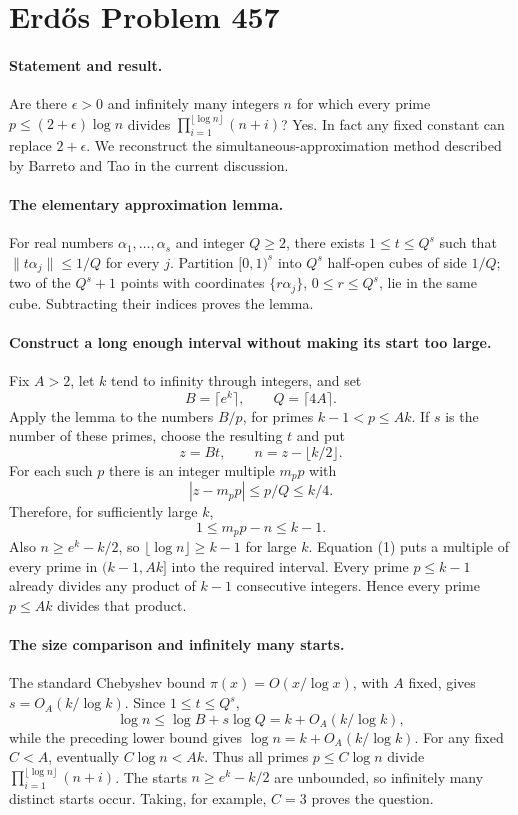 \section*{Erd\H{o}s Problem 457}

\paragraph{Statement and result.}
Are there \(\epsilon>0\) and infinitely many integers \(n\) for which
every prime \(p\leq(2+\epsilon)\log n\) divides
\(\prod_{i=1}^{\lfloor\log n\rfloor}(n+i)\)?
Yes. In fact any fixed constant can replace \(2+\epsilon\).
We reconstruct the simultaneous-approximation method described by
Barreto and Tao in the current discussion.

\paragraph{The elementary approximation lemma.}
For real numbers \(\alpha_1,\ldots,\alpha_s\) and integer \(Q\geq2\),
there exists \(1\leq t\leq Q^s\) such that
\(\|t\alpha_j\|\leq1/Q\) for every \(j\).
Partition \([0,1)^s\) into \(Q^s\) half-open cubes of side \(1/Q\);
two of the \(Q^s+1\) points with coordinates
\(\{r\alpha_j\}\), \(0\leq r\leq Q^s\), lie in the same cube.
Subtracting their indices proves the lemma.

\paragraph{Construct a long enough interval without making its start too large.}
Fix \(A>2\), let \(k\) tend to infinity through integers, and set
\[
 B=\lceil e^k\rceil,\qquad Q=\lceil4A\rceil.
\]
Apply the lemma to the numbers \(B/p\), for primes \(k-1<p\leq Ak\).
If \(s\) is the number of these primes, choose the resulting \(t\) and put
\[
 z=Bt,\qquad n=z-\lfloor k/2\rfloor.
\]
For each such \(p\) there is an integer multiple \(m_p p\) with
\[
 |z-m_pp|\leq p/Q\leq k/4.
\]
Therefore, for sufficiently large \(k\),
\[
 1\leq m_pp-n\leq k-1.
 \tag{1}
\]
Also \(n\geq e^k-k/2\), so \(\lfloor\log n\rfloor\geq k-1\)
for large \(k\). Equation (1) puts a multiple of every prime in
\((k-1,Ak]\) into the required interval. Every prime \(p\leq k-1\)
already divides any product of \(k-1\) consecutive integers.
Hence every prime \(p\leq Ak\) divides that product.

\paragraph{The size comparison and infinitely many starts.}
The standard Chebyshev bound \(\pi(x)=O(x/\log x)\), with \(A\)
fixed, gives \(s=O_A(k/\log k)\). Since \(1\leq t\leq Q^s\),
\[
 \log n\leq\log B+s\log Q
 =k+O_A(k/\log k),
\]
while the preceding lower bound gives \(\log n=k+O_A(k/\log k)\).
For any fixed \(C<A\), eventually \(C\log n<Ak\).
Thus all primes \(p\leq C\log n\) divide
\(\prod_{i=1}^{\lfloor\log n\rfloor}(n+i)\).
The starts \(n\geq e^k-k/2\) are unbounded, so infinitely many
distinct starts occur. Taking, for example, \(C=3\) proves the question.

